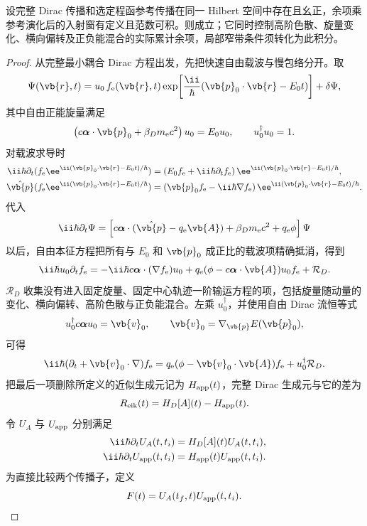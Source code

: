 \begin{proposition}[固定轨迹包络的传播误差]
设完整 Dirac 传播和选定程函参考传播在同一 Hilbert 空间中存在且幺正，余项乘参考演化后的入射窗有定义且范数可积。则成立；它同时控制高阶色散、旋量变化、横向偏转及正负能混合的实际累计余项，局部窄带条件须转化为此积分。
\end{proposition}
\begin{proof}
从完整最小耦合 Dirac 方程出发，先把快速自由载波与慢包络分开。取
\[
\Psi(\vb{r},t)
=u_0\,f_{\mathrm e}(\vb{r},t)
\exp\!\left[\frac{\ii}{\hbar}(\vb{p}_0\cdot\vb{r}-E_0t)\right]
+\delta\Psi,
\]
其中自由正能旋量满足
\[
\left(c\boldsymbol\alpha\cdot\vb{p}_0+\beta_Dm_{\mathrm e} c^2\right)u_0=E_0u_0,
\qquad u_0^\dagger u_0=1.
\]
对载波求导时
\begin{align*}
\ii\hbar\partial_t(f_{\mathrm e}\ee^{\ii(\vb{p}_0\cdot\vb{r}-E_0t)/\hbar})
&=\left(E_0f_{\mathrm e}+\ii\hbar\partial_tf_{\mathrm e}\right)
\ee^{\ii(\vb{p}_0\cdot\vb{r}-E_0t)/\hbar},\\
\hat{\vb{p}}(f_{\mathrm e}\ee^{\ii(\vb{p}_0\cdot\vb{r}-E_0t)/\hbar})
&=\left(\vb{p}_0f_{\mathrm e}-\ii\hbar\nabla f_{\mathrm e}\right)
\ee^{\ii(\vb{p}_0\cdot\vb{r}-E_0t)/\hbar}.
\end{align*}
代入
\[
\ii\hbar\partial_t\Psi=
\left[c\boldsymbol\alpha\cdot(\hat{\vb{p}}-q_{\mathrm e}\vb{A})
+\beta_Dm_{\mathrm e} c^2+q_{\mathrm e}\phi\right]\Psi
\]
以后，自由本征方程把所有与 $E_0$ 和 $\vb{p}_0$ 成正比的载波项精确抵消，得到
\[
\ii\hbar u_0\partial_tf_{\mathrm e}
=-\ii\hbar c\boldsymbol\alpha\cdot(\nabla f_{\mathrm e})u_0
+q_{\mathrm e}(\phi-c\boldsymbol\alpha\cdot\vb{A})u_0f_{\mathrm e}
+\mathcal R_D.
\]
$\mathcal R_D$ 收集没有进入固定旋量、固定中心轨迹一阶输运方程的项，包括旋量随动量的变化、横向偏转、高阶色散与正负能混合。左乘 $u_0^\dagger$，并使用自由 Dirac 流恒等式
\[
u_0^\dagger c\boldsymbol\alpha u_0=\vb{v}_0,
\qquad
\vb{v}_0=\nabla_{\vb{p}}E(\vb{p}_0),
\]
可得
\[
\ii\hbar(\partial_t+\vb{v}_0\cdot\nabla)f_{\mathrm e}
=q_{\mathrm e}(\phi-\vb{v}_0\cdot\vb{A})f_{\mathrm e}
+u_0^\dagger\mathcal R_D.
\]
把最后一项删除所定义的近似生成元记为 $H_{\rm app}(t)$，完整 Dirac 生成元与它的差为
\[
R_{\rm eik}(t)=H_D[A](t)-H_{\rm app}(t).
\]
令 $U_A$ 与 $U_{\rm app}$ 分别满足
\begin{align*}
\ii\hbar\partial_tU_A(t,t_i)&=H_D[A](t)U_A(t,t_i),\\
\ii\hbar\partial_tU_{\rm app}(t,t_i)&=H_{\rm app}(t)U_{\rm app}(t,t_i).
\end{align*}
为直接比较两个传播子，定义
\[
F(t)=U_A(t_f,t)U_{\rm app}(t,t_i).
\]
\end{proof}
